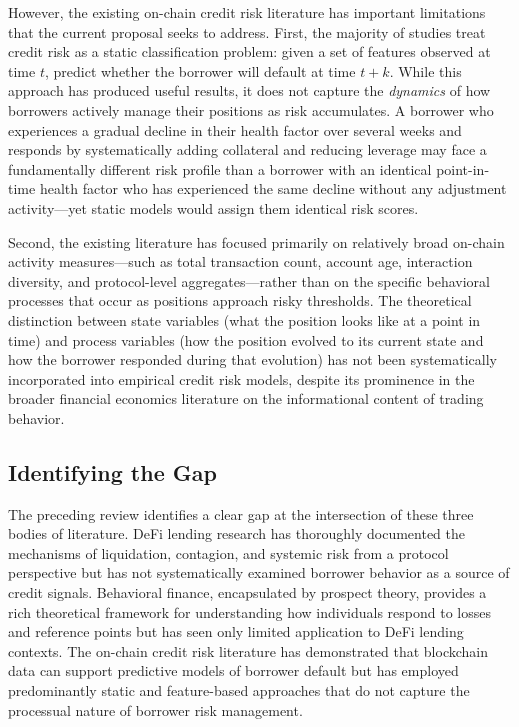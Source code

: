 However, the existing on-chain credit risk literature has important limitations that the current proposal seeks to address. First, the majority of studies treat credit risk as a static classification problem: given a set of features observed at time \(t\), predict whether the borrower will default at time \(t+k\). While this approach has produced useful results, it does not capture the \emph{dynamics} of how borrowers actively manage their positions as risk accumulates. A borrower who experiences a gradual decline in their health factor over several weeks and responds by systematically adding collateral and reducing leverage may face a fundamentally different risk profile than a borrower with an identical point-in-time health factor who has experienced the same decline without any adjustment activity—yet static models would assign them identical risk scores.

Second, the existing literature has focused primarily on relatively broad on-chain activity measures—such as total transaction count, account age, interaction diversity, and protocol-level aggregates—rather than on the specific behavioral processes that occur as positions approach risky thresholds. The theoretical distinction between state variables (what the position looks like at a point in time) and process variables (how the position evolved to its current state and how the borrower responded during that evolution) has not been systematically incorporated into empirical credit risk models, despite its prominence in the broader financial economics literature on the informational content of trading behavior.

\subsection{Identifying the Gap}

The preceding review identifies a clear gap at the intersection of these three bodies of literature. DeFi lending research has thoroughly documented the mechanisms of liquidation, contagion, and systemic risk from a protocol perspective but has not systematically examined borrower behavior as a source of credit signals. Behavioral finance, encapsulated by prospect theory, provides a rich theoretical framework for understanding how individuals respond to losses and reference points but has seen only limited application to DeFi lending contexts. The on-chain credit risk literature has demonstrated that blockchain data can support predictive models of borrower default but has employed predominantly static and feature-based approaches that do not capture the processual nature of borrower risk management.

